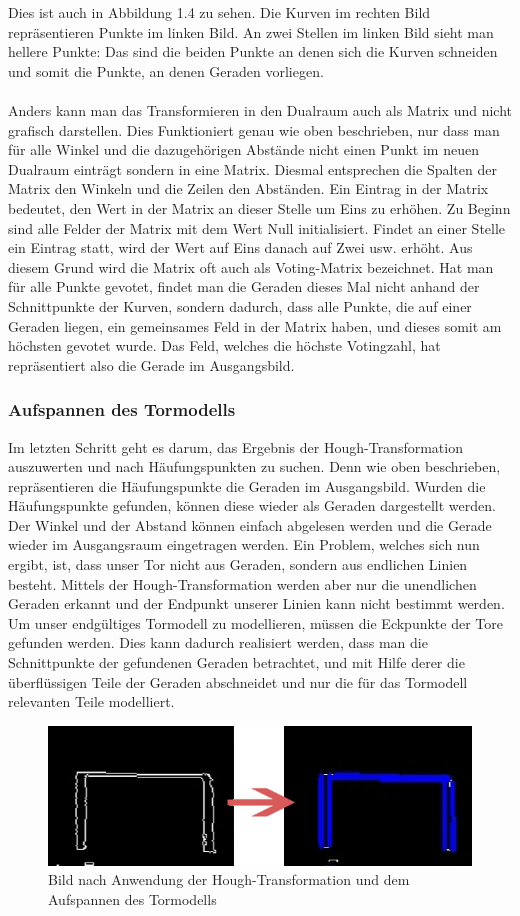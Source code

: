 \documentclass[a4paper,12pt]{article}
\begin{document}
Dies ist auch in Abbildung 1.4 zu sehen. Die Kurven im rechten Bild
repräsentieren Punkte im linken Bild. An zwei Stellen im linken Bild
sieht man hellere Punkte: Das sind die beiden Punkte an denen sich die
Kurven schneiden und somit die Punkte, an denen Geraden vorliegen.\\
\\
Anders kann man das Transformieren in den Dualraum auch als Matrix und
nicht grafisch darstellen. Dies Funktioniert genau wie oben beschrieben,
nur dass man für alle Winkel und die dazugehörigen Abstände nicht einen
Punkt im neuen Dualraum einträgt sondern in eine Matrix. Diesmal
entsprechen die Spalten der Matrix den Winkeln und die Zeilen den
Abständen. Ein Eintrag in der Matrix bedeutet, den Wert in der Matrix
an dieser Stelle um Eins zu erhöhen. Zu Beginn sind alle Felder
der Matrix mit dem Wert Null initialisiert. Findet an einer
Stelle ein Eintrag statt, wird der Wert auf Eins danach auf
Zwei usw. erhöht. Aus diesem Grund wird die Matrix oft auch als
Voting-Matrix bezeichnet. Hat man für alle Punkte gevotet, findet
man die Geraden dieses Mal nicht anhand der Schnittpunkte der Kurven,
sondern dadurch, dass alle Punkte, die auf einer Geraden liegen,
ein gemeinsames Feld in der Matrix haben, und dieses somit am höchsten
gevotet wurde. Das Feld, welches die höchste Votingzahl, hat repräsentiert
also die Gerade im Ausgangsbild.

\subsubsection{Aufspannen des Tormodells}
Im letzten Schritt geht es darum, das Ergebnis der Hough-Transformation auszuwerten
und nach Häufungspunkten zu suchen. Denn wie oben beschrieben, repräsentieren
die Häufungspunkte die Geraden im Ausgangsbild. Wurden die Häufungspunkte gefunden,
können diese wieder als Geraden dargestellt werden. Der Winkel und der
Abstand können einfach abgelesen werden und die Gerade wieder im Ausgangsraum
eingetragen werden. Ein Problem, welches sich nun ergibt, ist, dass unser Tor
nicht aus Geraden, sondern aus endlichen Linien besteht. Mittels der
Hough-Transformation werden aber nur die unendlichen Geraden erkannt
und der Endpunkt unserer Linien kann nicht bestimmt werden.
Um unser endgültiges Tormodell zu modellieren, müssen die Eckpunkte
der Tore gefunden werden. Dies kann dadurch realisiert werden, dass man
die Schnittpunkte der gefundenen Geraden betrachtet, und mit Hilfe derer
die überflüssigen Teile der Geraden abschneidet und nur die für das Tormodell
relevanten Teile modelliert.
\begin{figure}[H]
    \includegraphics[scale=0.6]{aufspannen.jpg}
    \caption{Bild nach Anwendung der Hough-Transformation und dem Aufspannen des Tormodells}
    \label{fig:aufspannen}
\end{figure}
\end{document}
